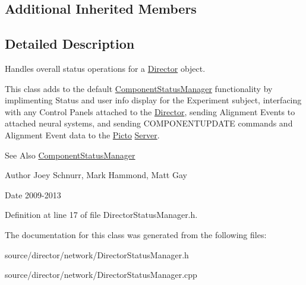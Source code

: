 \subsection*{Additional Inherited Members}


\subsection{Detailed Description}
Handles overall status operations for a \hyperlink{class_director}{Director} object. 

This class adds to the default \hyperlink{class_component_status_manager}{Component\-Status\-Manager} functionality by implimenting Status and user info display for the Experiment subject, interfacing with any Control Panels attached to the \hyperlink{class_director}{Director}, sending Alignment Events to attached neural systems, and sending C\-O\-M\-P\-O\-N\-E\-N\-T\-U\-P\-D\-A\-T\-E commands and Alignment Event data to the \hyperlink{namespace_picto}{Picto} \hyperlink{class_server}{Server}. \begin{DoxySeeAlso}{See Also}
\hyperlink{class_component_status_manager}{Component\-Status\-Manager} 
\end{DoxySeeAlso}
\begin{DoxyAuthor}{Author}
Joey Schnurr, Mark Hammond, Matt Gay 
\end{DoxyAuthor}
\begin{DoxyDate}{Date}
2009-\/2013 
\end{DoxyDate}


Definition at line 17 of file Director\-Status\-Manager.\-h.



The documentation for this class was generated from the following files\-:\begin{DoxyCompactItemize}
\item 
source/director/network/Director\-Status\-Manager.\-h\item 
source/director/network/Director\-Status\-Manager.\-cpp\end{DoxyCompactItemize}
